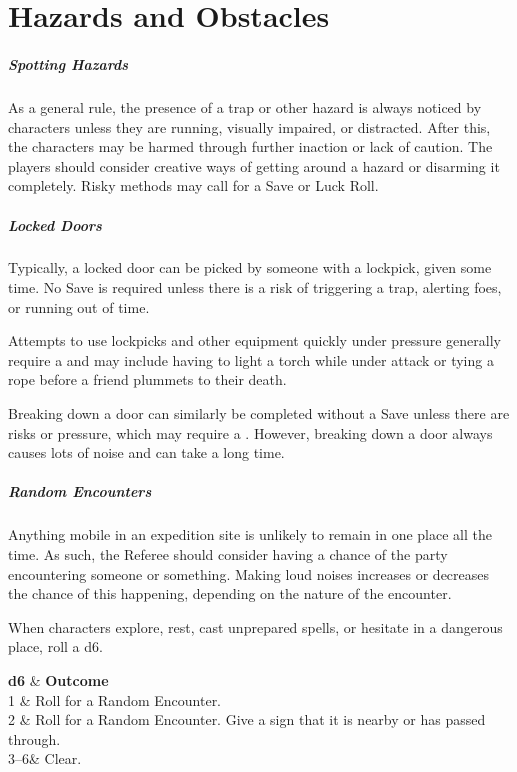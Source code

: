 \documentclass[itdr]{subfiles}
\begin{document}
\chapter{Hazards and Obstacles}

\paragraph{Spotting Hazards}
As a general rule, the presence of a trap or other hazard is always noticed by characters unless they are running, visually impaired, or distracted. After this, the characters may be harmed through further inaction or lack of caution. The players should consider creative ways of getting around a hazard or disarming it completely. Risky methods may call for a Save or Luck Roll.

\paragraph{Locked Doors}
Typically, a locked door can be picked by someone with a lockpick, given some time. No Save is required unless there is a risk of triggering a trap, alerting foes, or running out of time.

Attempts to use lockpicks and other equipment quickly under pressure generally require a  and may include having to light a torch while under attack or tying a rope before a friend plummets to their death.

Breaking down a door can similarly be completed without a Save unless there are risks or pressure, which may require a . However, breaking down a door always causes lots of noise and can take a long time.

\paragraph{Random Encounters}
Anything mobile in an expedition site is unlikely to remain in one place all the time. As such, the Referee should consider having a chance of the party encountering someone or something. Making loud noises increases or decreases the chance of this happening, depending on the nature of the encounter.

When characters explore, rest, cast unprepared spells, or hesitate in a dangerous place, roll a d6.

\begin{dtable}[cL]
	\textbf{d6} & \textbf{Outcome} \\
	1	& Roll for a Random Encounter.\\
	2	& Roll for a Random Encounter. Give a sign that it is nearby or has passed through.\\
	3--6& Clear.\\
\end{dtable}
\end{document}
